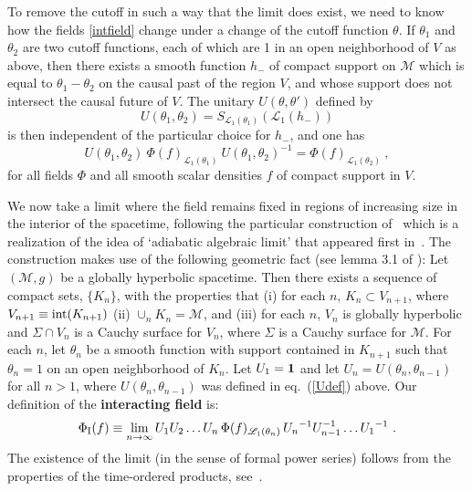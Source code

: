 \documentclass[12pt]{article}
\newcommand{\rI}{{\rm I}}
\newcommand{\eL}{\mathscr{L}}
\newcommand{\M}{\mathscr{M}}
\newcommand{\myid}{{\bf 1}}
\renewcommand{\O}{\Phi}
\theoremstyle{plain}
\theoremstyle{definition}
\begin{document}
To remove the cutoff in such a way that the limit does exist, we need
to know how the fields \eqref{intfield} change under
a change of the cutoff function $\theta$. If $\theta_1$ and
$\theta_2$ are two cutoff functions, each of which are 1 in an open
neighborhood of $V$ as above, then there exists a smooth function $h_-$
of compact support on $\M$ which is equal to $\theta_1 - \theta_2$ on the
causal past of the region $V$, and whose support does not intersect
the causal future of $V$. The unitary $U(\theta,\theta')$ defined by
\begin{equation}\label{Udef}
U(\theta_1,\theta_2) = S_{\eL_1(\theta_1)}(\eL_1(h_-))
\end{equation}
is then independent of the particular choice for $h_-$, and
one has \cite[thm. 8.6]{bf2}
\begin{equation}
\label{rel}
U(\theta_1, \theta_2) \ \O(f)_{\eL_1(\theta_1)} \ U(\theta_1, \theta_2)^{-1} =
\O(f)_{\eL_1(\theta_2)} \ ,
\end{equation}
for all fields $\O$ and all smooth scalar densities $f$
of compact support in $V$.

We now take a limit where the field remains fixed in
regions of increasing size in the interior of the spacetime, following 
the particular construction of~\cite{hw3} which is a realization of the idea of 
`adiabatic algebraic limit' that appeared first in~\cite{bf2}.
The construction makes use of the following
geometric fact (see lemma 3.1 of \cite{hw3}):
Let $(\M, g)$ be a globally hyperbolic spacetime. Then there exists a
sequence of compact sets, $\{K_n\}$, with the properties that (i) for
each $n$, $K_n \subset V_{n+1}$, where $V_{n+1} \equiv
{\rm int}(K_{n+1})$ (ii) $\cup_n K_n = \M$, and (iii) for each $n$,
$V_n$ is globally hyperbolic and $\Sigma \cap V_n$ is a Cauchy surface
for $V_n$, where $\Sigma$ is a Cauchy surface for $\M$.
For each $n$, let $\theta_n$ be a
smooth function with support contained in $K_{n+1}$ such that
$\theta_n = 1$ on an open neighborhood of $K_n$. Let $U_1 = \myid$ and let
$U_n = U(\theta_n, \theta_{n-1})$ for all $n>1$, where $U(\theta_n,
\theta_{n-1})$ was defined in eq.~(\ref{Udef}) above.  Our definition of the {\bf interacting field} is:
\begin{equation}\label{Ifield}
\O_{\rI}(f) \equiv \lim_{n \rightarrow \infty}   U_1
U_2  \dots U_n \, \O(f)_{\eL_1(\theta_n) } \, U_n{}^{-1} U_{n-1}^{-1} \dots U_1{}^{-1} \ .
\end{equation}
The existence of the limit (in the sense of formal power series) follows from the properties of the time-ordered products, see~\cite{hw3}.
\end{document}
